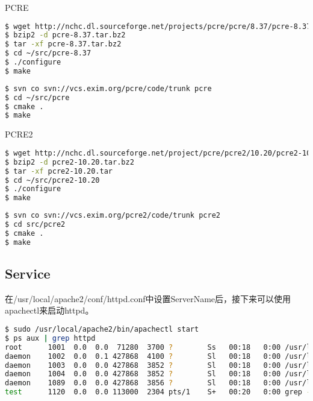 PCRE

\begin{lstlisting}[language=bash]
$ wget http://nchc.dl.sourceforge.net/projects/pcre/pcre/8.37/pcre-8.37.tar.bz2
$ bzip2 -d pcre-8.37.tar.bz2
$ tar -xf pcre-8.37.tar.bz2
$ cd ~/src/pcre-8.37
$ ./configure
$ make
\end{lstlisting}

\begin{lstlisting}[language=bash]
$ svn co svn://vcs.exim.org/pcre/code/trunk pcre
$ cd ~/src/pcre
$ cmake .
$ make 
\end{lstlisting}







PCRE2

\begin{lstlisting}[language=bash]
$ wget http://nchc.dl.sourceforge.net/project/pcre/pcre2/10.20/pcre2-10.20.tar.bz2
$ bzip2 -d pcre2-10.20.tar.bz2
$ tar -xf pcre2-10.20.tar
$ cd ~/src/pcre2-10.20
$ ./configure
$ make
\end{lstlisting}


\begin{lstlisting}[language=bash]
$ svn co svn://vcs.exim.org/pcre2/code/trunk pcre2
$ cd src/pcre2
$ cmake .
$ make
\end{lstlisting}


\subsection{Service}


在/usr/local/apache2/conf/httpd.conf中设置ServerName后，接下来可以使用apachectl来启动httpd。

\begin{lstlisting}[language=bash]
$ sudo /usr/local/apache2/bin/apachectl start
$ ps aux | grep httpd
root      1001  0.0  0.0  71280  3700 ?        Ss   00:18   0:00 /usr/local/apache2/bin/httpd -k start
daemon    1002  0.0  0.1 427868  4100 ?        Sl   00:18   0:00 /usr/local/apache2/bin/httpd -k start
daemon    1003  0.0  0.0 427868  3852 ?        Sl   00:18   0:00 /usr/local/apache2/bin/httpd -k start
daemon    1004  0.0  0.0 427868  3852 ?        Sl   00:18   0:00 /usr/local/apache2/bin/httpd -k start
daemon    1089  0.0  0.0 427868  3856 ?        Sl   00:18   0:00 /usr/local/apache2/bin/httpd -k start
test      1120  0.0  0.0 113000  2304 pts/1    S+   00:20   0:00 grep --color=auto httpd
\end{lstlisting}

